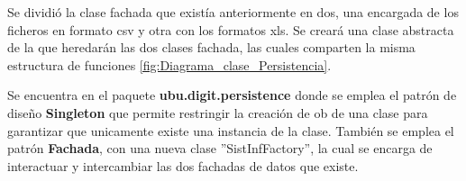 Se dividió la clase fachada que existía anteriormente en dos, una encargada de los ficheros en formato csv y otra con los formatos xls. Se creará una clase abstracta de la que heredarán las dos clases fachada, las cuales comparten la misma estructura de funciones \ref{fig:Diagrama_clase_Persistencia}.

Se encuentra en el paquete \textbf{ubu.digit.persistence} donde se emplea el patrón de diseño \textbf{Singleton} que permite restringir la creación de ob de una clase para garantizar que unicamente existe una instancia de la clase. También se emplea el patrón \textbf{Fachada}, con una nueva clase ''SistInfFactory'', la cual se encarga de interactuar y intercambiar las dos fachadas de datos que existe.



